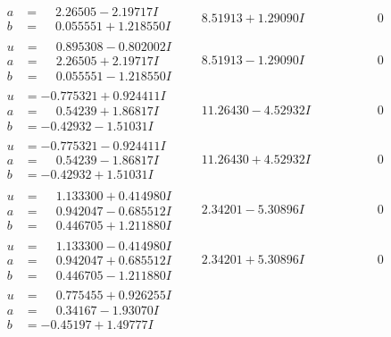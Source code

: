 \documentclass[1p]{elsarticle_modified}
\theoremstyle{definition}
\begin{document}
$$\begin{array}{c|c|c}
\begin{aligned}
a &= \phantom{-}2.26505 - 2.19717 I \\
b &= \phantom{-}0.055551 + 1.218550 I\end{aligned}
 & \phantom{-}8.51913 + 1.29090 I & \phantom{-0.000000 } 0 \\ \hline\begin{aligned}
u &= \phantom{-}0.895308 - 0.802002 I \\
a &= \phantom{-}2.26505 + 2.19717 I \\
b &= \phantom{-}0.055551 - 1.218550 I\end{aligned}
 & \phantom{-}8.51913 - 1.29090 I & \phantom{-0.000000 } 0 \\ \hline\begin{aligned}
u &= -0.775321 + 0.924411 I \\
a &= \phantom{-}0.54239 + 1.86817 I \\
b &= -0.42932 - 1.51031 I\end{aligned}
 & \phantom{-}11.26430 - 4.52932 I & \phantom{-0.000000 } 0 \\ \hline\begin{aligned}
u &= -0.775321 - 0.924411 I \\
a &= \phantom{-}0.54239 - 1.86817 I \\
b &= -0.42932 + 1.51031 I\end{aligned}
 & \phantom{-}11.26430 + 4.52932 I & \phantom{-0.000000 } 0 \\ \hline\begin{aligned}
u &= \phantom{-}1.133300 + 0.414980 I \\
a &= \phantom{-}0.942047 - 0.685512 I \\
b &= \phantom{-}0.446705 + 1.211880 I\end{aligned}
 & \phantom{-}2.34201 - 5.30896 I & \phantom{-0.000000 } 0 \\ \hline\begin{aligned}
u &= \phantom{-}1.133300 - 0.414980 I \\
a &= \phantom{-}0.942047 + 0.685512 I \\
b &= \phantom{-}0.446705 - 1.211880 I\end{aligned}
 & \phantom{-}2.34201 + 5.30896 I & \phantom{-0.000000 } 0 \\ \hline\begin{aligned}
u &= \phantom{-}0.775455 + 0.926255 I \\
a &= \phantom{-}0.34167 - 1.93070 I \\
b &= -0.45197 + 1.49777 I\end{aligned}

\end{array}$$
\end{document}
